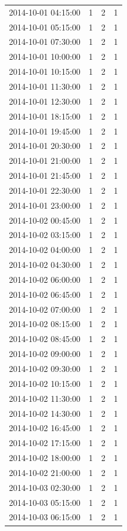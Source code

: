 \begin{tabular}{lrrr}
2014-10-01 04:15:00 & 1 & 2 & 1 \\
2014-10-01 05:15:00 & 1 & 2 & 1 \\
2014-10-01 07:30:00 & 1 & 2 & 1 \\
2014-10-01 10:00:00 & 1 & 2 & 1 \\
2014-10-01 10:15:00 & 1 & 2 & 1 \\
2014-10-01 11:30:00 & 1 & 2 & 1 \\
2014-10-01 12:30:00 & 1 & 2 & 1 \\
2014-10-01 18:15:00 & 1 & 2 & 1 \\
2014-10-01 19:45:00 & 1 & 2 & 1 \\
2014-10-01 20:30:00 & 1 & 2 & 1 \\
2014-10-01 21:00:00 & 1 & 2 & 1 \\
2014-10-01 21:45:00 & 1 & 2 & 1 \\
2014-10-01 22:30:00 & 1 & 2 & 1 \\
2014-10-01 23:00:00 & 1 & 2 & 1 \\
2014-10-02 00:45:00 & 1 & 2 & 1 \\
2014-10-02 03:15:00 & 1 & 2 & 1 \\
2014-10-02 04:00:00 & 1 & 2 & 1 \\
2014-10-02 04:30:00 & 1 & 2 & 1 \\
2014-10-02 06:00:00 & 1 & 2 & 1 \\
2014-10-02 06:45:00 & 1 & 2 & 1 \\
2014-10-02 07:00:00 & 1 & 2 & 1 \\
2014-10-02 08:15:00 & 1 & 2 & 1 \\
2014-10-02 08:45:00 & 1 & 2 & 1 \\
2014-10-02 09:00:00 & 1 & 2 & 1 \\
2014-10-02 09:30:00 & 1 & 2 & 1 \\
2014-10-02 10:15:00 & 1 & 2 & 1 \\
2014-10-02 11:30:00 & 1 & 2 & 1 \\
2014-10-02 14:30:00 & 1 & 2 & 1 \\
2014-10-02 16:45:00 & 1 & 2 & 1 \\
2014-10-02 17:15:00 & 1 & 2 & 1 \\
2014-10-02 18:00:00 & 1 & 2 & 1 \\
2014-10-02 21:00:00 & 1 & 2 & 1 \\
2014-10-03 02:30:00 & 1 & 2 & 1 \\
2014-10-03 05:15:00 & 1 & 2 & 1 \\
2014-10-03 06:15:00 & 1 & 2 & 1 \\

\end{tabular}
